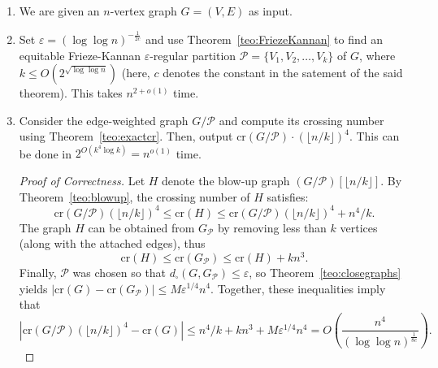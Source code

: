 \documentclass{article}
\begin{document}
\begin{enumerate}
    \item We are given an $n$-vertex graph $G=(V,E)$ as input.

    \item Set $\varepsilon=(\log\log n)^{-\frac{1}{2c}}$ and use Theorem~\ref{teo:FriezeKannan} to find an equitable Frieze-Kannan $\varepsilon$-regular partition $\mathcal{P}=\{V_1,V_2,\dots,V_k\}$ of $G$, where $k\leq O(2^{\sqrt{\log\log n}})$ (here, $c$ denotes the constant in the satement of the said theorem). This takes $n^{2+o(1)}$ time.

    \item Consider the edge-weighted graph $G/\mathcal{P}$ and compute its crossing number using Theorem~\ref{teo:exactcr}. Then, output $\text{cr}(G/\mathcal{P})\cdot (\lfloor n/k\rfloor)^4$. This can be done in $2^{O(k^4\log k)}=n^{o(1)}$ time.

\begin{proof}[Proof of Correctness]
    Let $H$ denote the blow-up graph $(G/\mathcal{P})[\lfloor n/k\rfloor]$. By Theorem~\ref{teo:blowup}, the crossing number of $H$ satisfies:\[\text{cr}(G/\mathcal{P})(\lfloor n/k\rfloor)^4\leq\text{cr}(H)\leq\text{cr}(G/\mathcal{P})(\lfloor n/k\rfloor)^4+n^4/k.\] The graph $H$ can be obtained from $G_\mathcal{P}$ by removing less than $k$ vertices (along with the attached edges), thus \[\text{cr}(H)\leq \text{cr}(G_\mathcal{P})\leq \text{cr}(H)+kn^3.\] Finally, $\mathcal{P}$ was chosen so that $d_\square(G,G_\mathcal{P})\leq\varepsilon$, so Theorem~\ref{teo:closegraphs} yields $|\text{cr}(G)-\text{cr}(G_\mathcal{P})|\leq M\varepsilon^{1/4}n^4$. Together, these inequalities imply that \[|\text{cr}(G/\mathcal{P})(\lfloor n/k\rfloor)^4- \text{cr}(G)|\leq n^4/k+kn^3+M\varepsilon^{1/4}n^4=O\left(\frac{n^4}{(\log\log n)^{\frac{1}{8c}}}\right).\]
\end{proof}


\end{enumerate}
\end{document}
